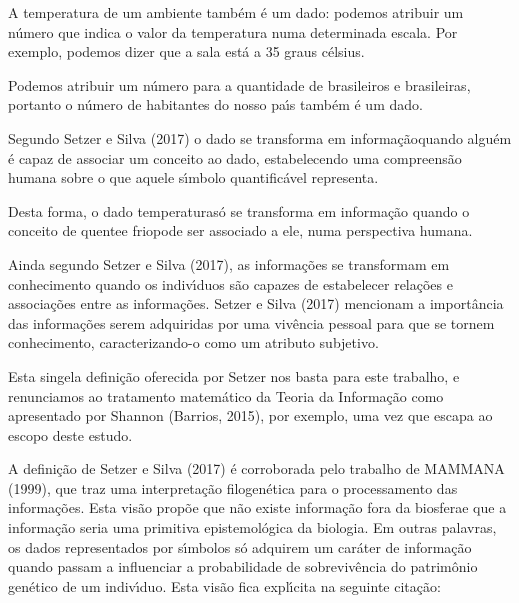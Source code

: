 \documentclass[
12pt,		%
openright,	%
twoside,  %
a4paper,			%
chapter=TITLE,		%
english,			%
french,				%
spanish,			%
brazil				%
]{USPSC-classe/USPSC_RedarTex}
\begin{document}
A temperatura de um ambiente tamb\'em \'e um dado: podemos atribuir um n\'umero que indica o valor da temperatura numa determinada escala. Por exemplo, podemos dizer que a sala \textquotedbl est\'a a 35 graus c\'elsius\textquotedbl .








Podemos atribuir um n\'umero para a quantidade de brasileiros e brasileiras, portanto o n\'umero de habitantes do nosso pa\'{\i}s tamb\'em \'e um dado.








Segundo Setzer e Silva (2017) o dado se transforma em \textquotedbl informa\c{c}\~ao\textquotedbl  quando algu\'em \'e capaz de associar um conceito ao dado, estabelecendo uma compreens\~ao humana sobre o que aquele s\'{\i}mbolo quantific\'avel representa.








Desta forma, o dado \textquotedbl temperatura\textquotedbl  s\'o se transforma em informa\c{c}\~ao quando o conceito de \textquotedbl quente\textquotedbl  e \textquotedbl frio\textquotedbl  pode ser associado a ele, numa perspectiva humana.








Ainda segundo Setzer e Silva (2017), as informa\c{c}\~oes se transformam em conhecimento quando os indiv\'{\i}duos s\~ao capazes de estabelecer rela\c{c}\~oes e associa\c{c}\~oes entre as informa\c{c}\~oes.  Setzer e Silva (2017) mencionam a import\^ancia das informa\c{c}\~oes serem adquiridas por uma viv\^encia pessoal para que se tornem conhecimento, caracterizando-o como um atributo subjetivo.








Esta singela defini\c{c}\~ao oferecida por Setzer nos basta para este trabalho, e renunciamos ao tratamento matem\'atico da Teoria da Informa\c{c}\~ao como apresentado por Shannon (Barrios, 2015), por exemplo, uma vez que escapa ao escopo deste estudo.








A defini\c{c}\~ao de Setzer e Silva (2017) \'e corroborada pelo trabalho de MAMMANA (1999), que traz uma interpreta\c{c}\~ao filogen\'etica para o processamento das informa\c{c}\~oes. Esta vis\~ao prop\~oe que \textquotedbl n\~ao existe informa\c{c}\~ao fora da biosfera\textquotedbl  e que a informa\c{c}\~ao seria uma primitiva epistemol\'ogica da biologia. Em outras palavras, os dados representados por s\'{\i}mbolos s\'o adquirem um car\'ater de informa\c{c}\~ao quando passam a influenciar a probabilidade de sobreviv\^encia do patrim\^onio gen\'etico de um indiv\'{\i}duo. Esta vis\~ao fica expl\'{\i}cita na seguinte cita\c{c}\~ao:
\end{document}
